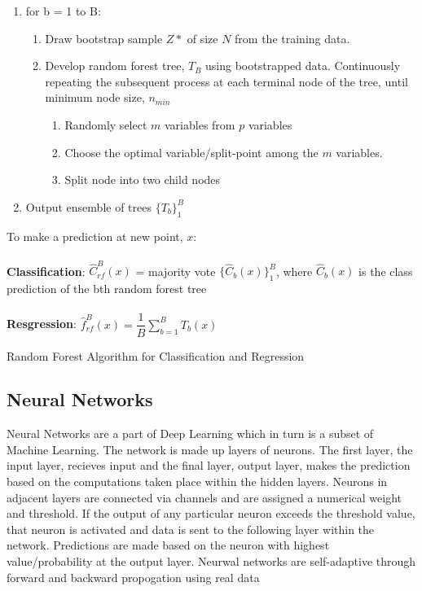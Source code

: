 \begin{algorithm}[H]
    \SetAlgoLined
    \begin{enumerate}
        \item for b = 1 to B:
        \bigskip
        \begin{enumerate}
            \item Draw bootstrap sample $Z*$ of size $N$ from the training data.
            \item Develop random forest tree, $T_B$ using bootstrapped data. Continuously repeating the subsequent process at each terminal node of the tree, 
            until minimum node size, $n_{min}$ 
            \bigskip
            \begin{enumerate}
                \item Randomly select $m$ variables from $p$ variables
                \item Choose the optimal variable/split-point among the $m$ variables.
                \item Split node into two child nodes
            \end{enumerate}
        \end{enumerate}
        \bigskip
        \item Output ensemble of trees $\{T_b\}^B_1$
    \end{enumerate}

    \bigskip
    To make a prediction at new point, $x$: \\
    \\
    \textbf{Classification}: $\hat{C}_{rf}^B(x)$ = majority vote $\{\hat{C}_b(x)\}^B_1$, where $\hat{C}_b(x)$ is the class prediction of the bth random forest tree\\
    \\\textbf{Resgression}:  $\hat{f}^B_{rf}(x) = \dfrac{1}{B} \sum^B_{b=1}T_b(x)$
    \caption{Random Forest Algorithm for Classification and Regression \cite{rf}}
\end{algorithm}

\subsection{Neural Networks}
Neural Networks are a part of Deep Learning which in turn is a subset of Machine Learning.
The network is made up layers of neurons.
The first layer, the input layer, recieves input and the final layer, output layer, makes the prediction based on the computations taken place within the hidden layers.
Neurons in adjacent layers are connected via channels and are assigned a numerical weight and threshold.
If the output of any particular neuron exceeds the threshold value, that neuron is activated and data is sent to the following layer within the network.
Predictions are made based on the neuron with highest value/probability at the output layer. 
Neurwal networks are self-adaptive through forward and backward propogation using real data

